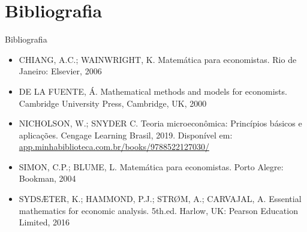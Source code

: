 \documentclass[10pt]{beamer}
\begin{document}
\section{Bibliografia}
\begin{frame}{ Bibliografia}
    \begin{itemize}                
        \item CHIANG, A.C.; WAINWRIGHT, K. Matemática para economistas. Rio de Janeiro: Elsevier, 2006\medskip
        \item DE LA FUENTE, Á. Mathematical methods and models for economists. Cambridge University Press, Cambridge, UK, 2000\medskip
        \item NICHOLSON, W.; SNYDER C. Teoria microeconômica: Princípios básicos e aplicações. Cengage Learning Brasil, 2019. Disponível em: \href{https://app.minhabiblioteca.com.br/books/9788522127030/}{app.minhabiblioteca.com.br/books/9788522127030/}\medskip
        \item SIMON, C.P.; BLUME, L. Matemática para economistas. Porto Alegre: Bookman, 2004\medskip
        \item SYDSÆTER, K.; HAMMOND, P.J.; STRØM, A.; CARVAJAL, A. Essential mathematics for economic analysis. 5th.ed. Harlow, UK: Pearson Education Limited, 2016
    \end{itemize}
\end{frame}
\end{document}
